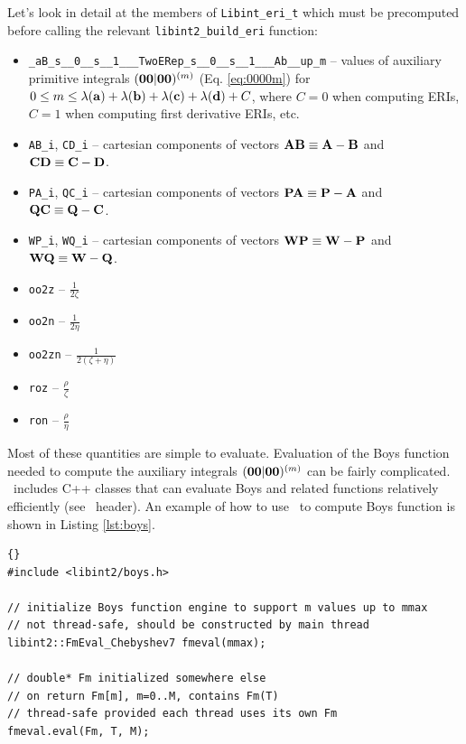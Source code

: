 \documentclass[10pt]{article}
\begin{document}
Let's look in detail at the members of {\tt Libint\_eri\_t} which must be precomputed before
calling the relevant {\tt libint2\_build\_eri} function:
\begin{itemize}
\item {\tt \_aB\_s\_\_0\_\_s\_\_1\_\_\_TwoERep\_s\_\_0\_\_s\_\_1\_\_\_Ab\_\_up\_m} --
values of auxiliary primitive integrals $({\bf 00}|{\bf 00})^{(m)}$ (Eq.
\eqref{eq:0000m}) for $0 \leq m \leq \lambda({\bf a}) + \lambda({\bf b}) +
\lambda({\bf c}) + \lambda({\bf d}) + C$, where $C = 0$ when computing ERIs, $C=1$ when computing first derivative ERIs, etc.
\item {\tt AB\_i}, {\tt CD\_i} -- cartesian components of vectors ${\bf AB} \equiv {\bf A} - {\bf B}$
and ${\bf CD} \equiv {\bf C} - {\bf D}$.
\item {\tt PA\_i}, {\tt QC\_i} -- cartesian components of vectors ${\bf PA} \equiv {\bf P} - {\bf A}$
and ${\bf QC} \equiv {\bf Q} - {\bf C}$.
\item {\tt WP\_i}, {\tt WQ\_i} -- cartesian components of vectors ${\bf WP} \equiv {\bf W} - {\bf P}$
and ${\bf WQ} \equiv {\bf W} - {\bf Q}$.
\item {\tt oo2z} -- $\frac{1}{2\zeta}$
\item {\tt oo2n} -- $\frac{1}{2\eta}$
\item {\tt oo2zn} -- $\frac{1}{2(\zeta+\eta)}$
\item {\tt roz} -- $\frac{\rho}{\zeta}$
\item {\tt ron} -- $\frac{\rho}{\eta}$
\end{itemize}
Most of these quantities are simple to evaluate. Evaluation of the Boys function needed to compute
the auxiliary integrals $({\bf 00}|{\bf 00})^{(m)}$ can be fairly complicated.\cite{Gill91}
\LIBINT\ includes C++ classes that can evaluate Boys and related functions relatively
efficiently (see \boysh\ header). An example of how to use \LIBINT\ to compute Boys function
is shown in Listing \ref{lst:boys}.
\begin{lstlisting}[label=lst:boys,caption=Computation of Boys function using \LIBINT.]{}
#include <libint2/boys.h>

// initialize Boys function engine to support m values up to mmax
// not thread-safe, should be constructed by main thread
libint2::FmEval_Chebyshev7 fmeval(mmax);

// double* Fm initialized somewhere else
// on return Fm[m], m=0..M, contains Fm(T)
// thread-safe provided each thread uses its own Fm
fmeval.eval(Fm, T, M);
\end{lstlisting}
\end{document}
